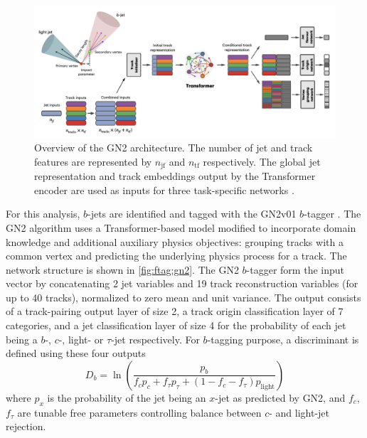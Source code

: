 \documentclass[../thesis.tex]{subfiles}
\begin{document}
\begin{figure}[!htbp]
\begin{center}
\includegraphics[width=\linewidth]{fig/reco_ftag_gn2.png}
\caption[Overview of the GN2 architecture. The number of jet and track features are represented by $n_\text{jf}$ and $n_\text{tf}$ respectively. The global jet representation and track embeddings output by the Transformer encoder are used as inputs for three task-specific networks.]{\label{fig:ftag:gn2}Overview of the GN2 architecture. The number of jet and track features are represented by $n_\text{jf}$ and $n_\text{tf}$ respectively. The global jet representation and track embeddings output by the Transformer encoder are used as inputs for three task-specific networks \citep{ftag:gn2}.}
\end{center}
\end{figure}
For this analysis, $b$-jets are identified and tagged with the GN2v01 $b$-tagger \citep{ftag:gn2}. The GN2 algorithm uses a Transformer-based model \citep{ftag:transformer} modified to incorporate domain knowledge and additional auxiliary physics objectives: grouping tracks with a common vertex and predicting the underlying physics process for a track. The network structure is shown in \autoref{fig:ftag:gn2}. The GN2 $b$-tagger form the input vector by concatenating 2 jet variables and 19 track reconstruction variables (for up to 40 tracks), normalized to zero mean and unit variance. The output consists of a track-pairing output layer of size 2, a track origin classification layer of 7 categories, and a jet classification layer of size 4 for the probability of each jet being a $b$-, $c$-, light- or $\tau$-jet respectively. For $b$-tagging purpose, a discriminant is defined using these four outputs
\begin{equation}
D_b = \ln \left( \displaystyle\frac{p_b}{f_c p_c + f_\tau p_\tau + (1-f_c-f_\tau) p_\text{light}} \right)
\end{equation}
where $p_x$ is the probability of the jet being an $x$-jet as predicted by GN2, and $f_c$, $f_\tau$ are tunable free parameters controlling balance between $c$- and light-jet rejection.
\end{document}
